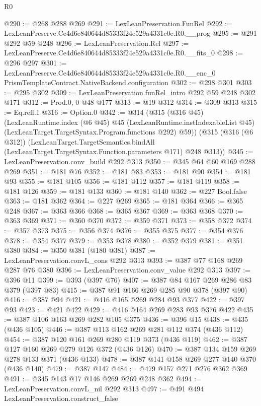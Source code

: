 \begin{lexlean}{R0}
\begin{coremodule}
@290 := @268 @288 @269
@291 := LexLeanPreservation.FunRel
@292 := LexLeanPreserve.Ce4d6e840644d85333f24e529a4331c0e.R0.__prog
@295 := @291 @292 @59 @248
@296 := LexLeanPreservation.Rel
@297 := LexLeanPreserve.Ce4d6e840644d85333f24e529a4331c0e.R0.__fits_0
@298 := @296 @297
@301 := LexLeanPreserve.Ce4d6e840644d85333f24e529a4331c0e.R0.__enc_0
    PrismTemplateContract.NativeBackend.configuration
@302 := @298 @301
@303 := @295 @302
@309 := LexLeanPreservation.funRel_intro @292 @59 @248 @302 @171
@312 := Prod.{0, 0} @48 @177
@313 := @19 @312
@314 := @309 @313
@315 := Eq.refl.{1}
@316 := Option.{0}
@342 := @314
    (@315
      (@316 @45)
      (LexLeanRuntime.index
        (@6 @45)
        @45
        (LexLeanRuntime.instIndexableList @45)
        (LexLeanTarget.TargetSyntax.Program.functions @292)
        @59))
    (@315
      (@316 (@6 @312))
      (LexLeanTarget.TargetSemantics.bindAll
        (LexLeanTarget.TargetSyntax.Function.parameters @171)
        @248
        @313))
@345 := LexLeanPreservation.conv_build @292 @313
@350 := @345 @64 @60 @169 @288 @269
@351 := @181 @76
@352 := @181 @83
@353 := @181 @90
@354 := @181 @93
@355 := @181 @105
@356 := @181 @112
@357 := @181 @119
@358 := @181 @126
@359 := @181 @133
@360 := @181 @140
@362 := @227 Bool.false
@363 := @181 @362
@364 := @227 @269
@365 := @181 @364
@366 := @365 @248
@367 := @363 @366
@368 := @365 @367
@369 := @363 @368
@370 := @363 @369
@371 := @360 @370
@372 := @359 @371
@373 := @358 @372
@374 := @357 @373
@375 := @356 @374
@376 := @355 @375
@377 := @354 @376
@378 := @354 @377
@379 := @353 @378
@380 := @352 @379
@381 := @351 @380
@384 := @350 @381 (@180 @381)
@387 := LexLeanPreservation.convL_cons @292 @313
@393 := @387 @77 @168 @269 @287 @76 @380
@396 := LexLeanPreservation.conv_value @292 @313
@397 := @396 @11
@399 := @393 (@397 @76)
@407 := @387 @84 @167 @269 @286 @83 @379 (@397 @83)
@415 := @387 @91 @166 @269 @285 @90 @378 (@397 @90)
@416 := @387 @94
@421 := @416 @165 @269 @284 @93 @377
@422 := @397 @93
@423 := @421 @422
@429 := @416 @164 @269 @283 @93 @376 @422
@435 := @387 @106 @163 @269 @282 @105 @375
@436 := @396 @15
@438 := @435 (@436 @105)
@446 := @387 @113 @162 @269 @281 @112 @374 (@436 @112)
@454 := @387 @120 @161 @269 @280 @119 @373 (@436 @119)
@462 := @387 @127 @160 @269 @279 @126 @372 (@436 @126)
@470 := @387 @134 @159 @269 @278 @133 @371 (@436 @133)
@478 := @387 @141 @158 @269 @277 @140 @370 (@436 @140)
@479 := @387 @147
@484 := @479 @157 @271 @276 @362 @369
@491 := @345 @143 @17 @146 @269 @269 @248 @362
@494 := LexLeanPreservation.convL_nil @292 @313
@497 := @491 @494 LexLeanPreservation.construct_false

\end{coremodule}
\end{lexlean}

